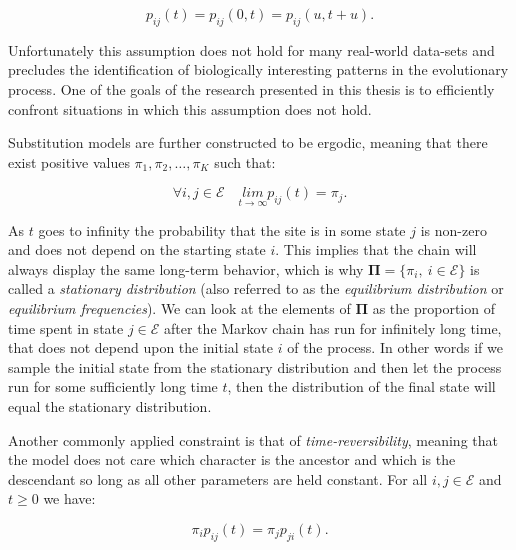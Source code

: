 \begin{equation}
p_{ij}\left(t\right) = p_{ij}\left(0,t\right) = p_{ij}\left(u,t+u\right).
\label{eq:time_homogeneity}
\end{equation}

Unfortunately this assumption does not hold for many real-world data-sets and precludes the identification of biologically interesting patterns in the evolutionary process. %
One of the goals of the research presented in this thesis is to efficiently confront situations in which this assumption does not hold.

Substitution models are further constructed to be ergodic, meaning that there exist positive values $\pi_{1},\pi_{2},\ldots,\pi_{K}$ such that:

\begin{equation}
\forall i,j\in \mathcal{E}  \quad\underset{t\rightarrow\infty}{lim}p_{ij}(t)=\pi_{j}.
\label{eq:ergodicity}
\end{equation}


As $t$ goes to infinity the probability that the site is in some state $j$ is non-zero and does not depend on the starting state $i$.
This implies that the chain will always display the same long-term behavior, which is why $\mathbf{\Pi}=\{\pi_{i},\ i\in\mathcal{E}\}$ is called a \emph{stationary distribution} (also referred to as the \emph{equilibrium distribution} or \emph{equilibrium frequencies}).
We can look at the elements of $\mathbf{\Pi}$ as the proportion of time spent in state $j\in\mathcal{E}$ after the Markov chain has run for infinitely long time, that does not depend upon the initial state $i$ of the process.
In other words if we sample the initial state from the stationary distribution and then let the process run for some sufficiently long time $t$, then the distribution of the final state will equal the stationary distribution. 

Another commonly applied constraint is that of \emph{time-reversibility}, meaning that the model does not care which character is the ancestor and which is the descendant so long as all other parameters are held constant.
For all $i,j\in \mathcal{E}$ and $t\geq 0$ we have:

\begin{equation}
\pi_{i}p_{ij}(t)=\pi_{j}p_{ji}(t).
\label{eq:time_reversibility1}
\end{equation}


